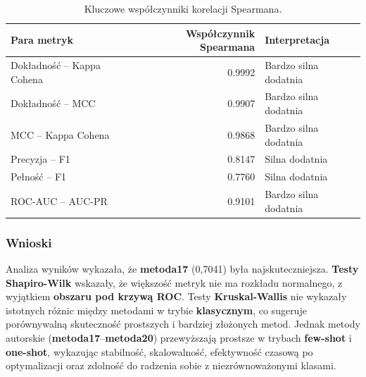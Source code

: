\begin{table}[H]
	\centering
	\caption{Kluczowe współczynniki korelacji Spearmana.}
	\label{tab:buzzfeed_spearman_correlations}
	\begin{tabular}{l r l}
		\toprule
		\textbf{Para metryk}       & \textbf{Współczynnik Spearmana} & \textbf{Interpretacja} \\
		\midrule
		Dokładność -- Kappa Cohena & 0.9992                          & Bardzo silna dodatnia  \\
		Dokładność -- MCC          & 0.9907                          & Bardzo silna dodatnia  \\
		MCC -- Kappa Cohena        & 0.9868                          & Bardzo silna dodatnia  \\
		Precyzja -- F1             & 0.8147                          & Silna dodatnia         \\
		Pełność -- F1              & 0.7760                          & Silna dodatnia         \\
		ROC-AUC -- AUC-PR          & 0.9101                          & Bardzo silna dodatnia  \\
		\bottomrule
	\end{tabular}
\end{table}

\subsubsection{Wnioski}
Analiza wyników wykazała, że \textbf{metoda17} (0,7041) była najskuteczniejsza. \textbf{Testy Shapiro-Wilk} wskazały, że większość metryk nie ma rozkładu normalnego, z wyjątkiem \textbf{obszaru pod krzywą ROC}. Testy \textbf{Kruskal-Wallis} nie wykazały istotnych różnic między metodami w trybie \textbf{klasycznym}, co sugeruje porównywalną skuteczność prostszych i bardziej złożonych metod. Jednak metody autorskie (\textbf{metoda17}--\textbf{metoda20}) przewyższają prostsze w trybach \textbf{few-shot} i \textbf{one-shot}, wykazując stabilność, skalowalność, efektywność czasową po optymalizacji oraz zdolność do radzenia sobie z niezrównoważonymi klasami.